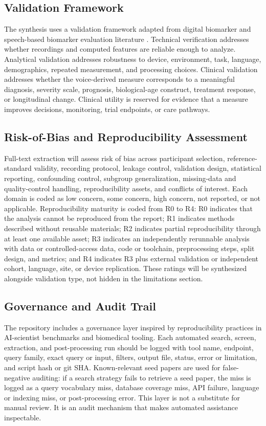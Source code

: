 \documentclass[11pt]{article}
\begin{document}
\subsection{Validation Framework}

The synthesis uses a validation framework adapted from digital biomarker and speech-based biomarker evaluation literature \citep{babrak2019traditional,robin2020evaluation}. Technical verification addresses whether recordings and computed features are reliable enough to analyze. Analytical validation addresses robustness to device, environment, task, language, demographics, repeated measurement, and processing choices. Clinical validation addresses whether the voice-derived measure corresponds to a meaningful diagnosis, severity scale, prognosis, biological-age construct, treatment response, or longitudinal change. Clinical utility is reserved for evidence that a measure improves decisions, monitoring, trial endpoints, or care pathways.

\subsection{Risk-of-Bias and Reproducibility Assessment}

Full-text extraction will assess risk of bias across participant selection, reference-standard validity, recording protocol, leakage control, validation design, statistical reporting, confounding control, subgroup generalization, missing-data and quality-control handling, reproducibility assets, and conflicts of interest. Each domain is coded as low concern, some concern, high concern, not reported, or not applicable. Reproducibility maturity is coded from R0 to R4: R0 indicates that the analysis cannot be reproduced from the report; R1 indicates methods described without reusable materials; R2 indicates partial reproducibility through at least one available asset; R3 indicates an independently rerunnable analysis with data or controlled-access data, code or toolchain, preprocessing steps, split design, and metrics; and R4 indicates R3 plus external validation or independent cohort, language, site, or device replication. These ratings will be synthesized alongside validation type, not hidden in the limitations section.

\subsection{Governance and Audit Trail}

The repository includes a governance layer inspired by reproducibility practices in AI-scientist benchmarks and biomedical tooling. Each automated search, screen, extraction, and post-processing run should be logged with tool name, endpoint, query family, exact query or input, filters, output file, status, error or limitation, and script hash or git SHA. Known-relevant seed papers are used for false-negative auditing: if a search strategy fails to retrieve a seed paper, the miss is logged as a query vocabulary miss, database coverage miss, API failure, language or indexing miss, or post-processing error. This layer is not a substitute for manual review. It is an audit mechanism that makes automated assistance inspectable.
\end{document}
